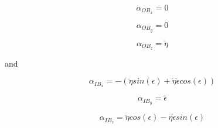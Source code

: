 \begin{equation}
   \alpha_{OB_x} = 0
\end{equation}

\begin{equation}
   \alpha_{OB_y} = 0
\end{equation}

\begin{equation}
   \alpha_{OB_z} = \ddot \eta
\end{equation}

and

\begin{equation}
   \alpha_{IB_x} = - (\ddot \eta sin(\epsilon) + \dot \eta \dot \epsilon cos(\epsilon))
\end{equation}

\begin{equation}
   \alpha_{IB_y} = \ddot \epsilon 
\end{equation}

\begin{equation}
   \label{alphaelevacao}
   \alpha_{IB_z} = \ddot \eta cos(\epsilon) - \dot \eta \dot \epsilon sin(\epsilon)
\end{equation}





